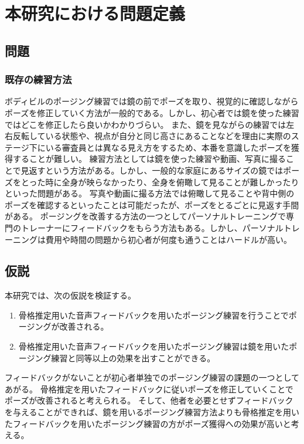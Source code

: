 \chapter{本研究における問題定義}
\label{issue}
\section{問題}
\subsection{既存の練習方法}
ボディビルのポージング練習では鏡の前でポーズを取り、視覚的に確認しながらポーズを修正していく方法が一般的である。しかし、初心者では鏡を使った練習ではどこを修正したら良いかわかりづらい。
また、鏡を見ながらの練習では左右反転している状態や、視点が自分と同じ高さにあることなどを理由に実際のステージ下にいる審査員とは異なる見え方をするため、本番を意識したポーズを獲得することが難しい。
練習方法としては鏡を使った練習や動画、写真に撮ることで見返すという方法がある。しかし、一般的な家庭にあるサイズの鏡ではポーズをとった時に全身が映らなかったり、全身を俯瞰して見ることが難しかったりといった問題がある。
写真や動画に撮る方法では俯瞰して見ることや背中側のポーズを確認するといったことは可能だったが、ポーズをとるごとに見返す手間がある。
ポージングを改善する方法の一つとしてパーソナルトレーニングで専門のトレーナーにフィードバックをもらう方法もある。しかし、パーソナルトレーニングは費用や時間の問題から初心者が何度も通うことはハードルが高い。

\section{仮説}
本研究では、次の仮説を検証する。
\begin{enumerate}
  \item 骨格推定用いた音声フィードバックを用いたポージング練習を行うことでポージングが改善される。
  \item 骨格推定用いた音声フィードバックを用いたポージング練習は鏡を用いたポージング練習と同等以上の効果を出すことができる。
\end{enumerate}
フィードバックがないことが初心者単独でのポージング練習の課題の一つとしてあがる。
骨格推定を用いたフィードバックに従いポーズを修正していくことでポーズが改善されると考えられる。
そして、他者を必要とせずフィードバックを与えることができれば、鏡を用いるポージング練習方法よりも骨格推定を用いたフィードバックを用いたポージング練習の方がポーズ獲得への効果が高いと考える。

